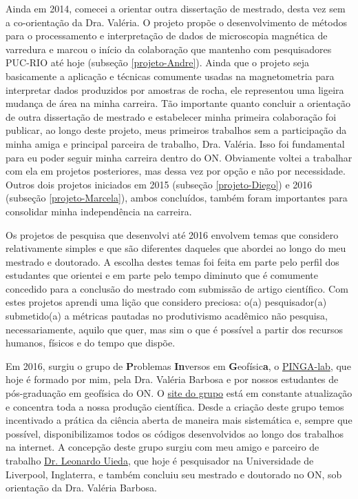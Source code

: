 Ainda em 2014, comecei a orientar outra dissertação de mestrado, desta vez sem a 
co-orientação da Dra. Valéria. O projeto propõe o desenvolvimento de métodos 
para o processamento e interpretação de dados de microscopia magnética de varredura e
marcou o início da colaboração que mantenho com pesquisadores PUC-RIO até hoje
(subseção \ref{projeto-Andre}). 
Ainda que o projeto seja basicamente a aplicação e técnicas comumente usadas na 
magnetometria para interpretar dados produzidos por amostras de rocha, ele representou 
uma ligeira mudança de área na minha carreira. Tão importante quanto concluir a 
orientação de outra dissertação de mestrado e estabelecer minha primeira colaboração foi 
publicar, ao longo deste projeto, meus primeiros trabalhos sem a participação da 
minha amiga e principal parceira de trabalho, Dra. Valéria. Isso foi fundamental para 
eu poder seguir minha carreira dentro do ON. Obviamente voltei a 
trabalhar com ela em projetos posteriores, mas dessa vez por opção e não por necessidade.
Outros dois projetos iniciados em 2015 (subseção \ref{projeto-Diego}) e 2016 
(subseção \ref{projeto-Marcela}), ambos concluídos, também foram importantes para 
consolidar minha independência na carreira.

Os projetos de pesquisa que desenvolvi até 2016 envolvem temas que considero 
relativamente simples e que são diferentes daqueles que abordei ao longo do meu 
mestrado e doutorado. A escolha destes temas foi feita em parte pelo perfil dos 
estudantes que orientei e em parte pelo tempo diminuto que é comumente concedido 
para a conclusão do mestrado com submissão de artigo científico. 
Com estes projetos aprendi uma lição que considero preciosa: o(a) pesquisador(a) 
submetido(a) a métricas pautadas no produtivismo acadêmico não pesquisa, necessariamente, 
aquilo que quer, mas sim o que é possível a partir dos recursos humanos, físicos e do
tempo que dispõe.

Em 2016, surgiu o grupo de \textbf{P}roblemas \textbf{In}versos 
em \textbf{G}eofísic\textbf{a}, o \href{https://www.pinga-lab.org/}{PINGA-lab}, 
que hoje é formado por mim, pela Dra. Valéria Barbosa e por nossos estudantes de 
pós-graduação em geofísica do ON. O \href{https://www.pinga-lab.org/}{site do grupo} 
está em constante atualização e concentra toda a nossa produção científica. 
Desde a criação deste grupo temos incentivado a prática da ciência aberta de maneira 
mais sistemática e, sempre que possível, disponibilizamos todos os códigos desenvolvidos 
ao longo dos trabalhos na internet. A concepção deste grupo surgiu com meu amigo e 
parceiro de trabalho \href{https://www.leouieda.com/}{Dr. Leonardo Uieda}, que hoje 
é pesquisador na Universidade de Liverpool, Inglaterra, e também concluiu seu mestrado 
e doutorado no ON, sob orientação da Dra. Valéria Barbosa.

